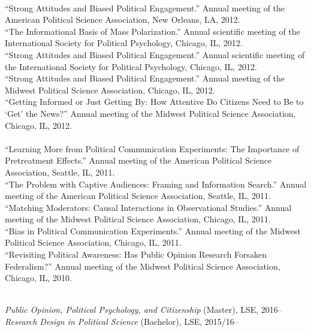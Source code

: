 \documentclass[12pt]{article}
\renewcommand{\section}[1]{\pagebreak[3]%
    \llap{\scshape\smash{\parbox[t]{\marginparwidth}{\raggedright {\color{lg}#1}}}}%
    \vspace{-\baselineskip}\par}
\newcommand{\topic}[1]{\pagebreak[3]\indent {\color{lg}{\footnotesize #1 }}\\}
\newcommand{\entry}[1]{\indent {\color{lg}\guillemotright}\hspace{2pt}#1\vspace{.25em}\\}
\begin{document}
	\topic{Conference Papers (2012)}
	\entry{``Strong Attitudes and Biased Political Engagement.'' Annual meeting of the American Political Science Association, New Orleans, LA, 2012.}
	\entry{``The Informational Basis of Mass Polarization.'' Annual scientific meeting of the International Society for Political Psychology, Chicago, IL, 2012.}
	\entry{``Strong Attitudes and Biased Political Engagement.'' Annual scientific meeting of the International Society for Political Psychology, Chicago, IL, 2012.}
	\entry{``Strong Attitudes and Biased Political Engagement.'' Annual meeting of the Midwest Political Science Association, Chicago, IL, 2012.}
	\entry{``Getting Informed or Just Getting By: How Attentive Do Citizens Need to Be to `Get' the News?'' Annual meeting of the Midwest Political Science Association, Chicago, IL, 2012.}
	
	\topic{Conference Papers (2011 and earlier)}
	\entry{``Learning More from Political Communication Experiments: The Importance of Pretreatment Effects.'' Annual meeting of the American Political Science Association, Seattle, IL, 2011.}
	\entry{``The Problem with Captive Audiences: Framing and Information Search.'' Annual meeting of the American Political Science Association, Seattle, IL, 2011.}
	\entry{``Matching Moderators: Causal Interactions in Observational Studies.'' Annual meeting of the Midwest Political Science Association, Chicago, IL, 2011.}
	\entry{``Bias in Political Communication Experiments.'' Annual meeting of the Midwest Political Science Association, Chicago, IL, 2011.}
	\entry{``Revisiting Political Awareness: Has Public Opinion Research Forsaken Federalism?'' Annual meeting of the Midwest Political Science Association, Chicago, IL, 2010.}

\section{Teaching \&\\ Advising}
\topic{Lecturing: London School of Economics and Political Science}
	\entry{\textit{Public Opinion, Political Psychology, and Citizenship} (Master), LSE, 2016--}
	\entry{\textit{Research Design in Political Science} (Bachelor), LSE, 2015/16--}
\end{document}
